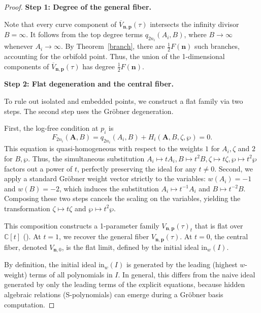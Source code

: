 \documentclass[11pt]{amsart}
\theoremstyle{remark}
\numberwithin{equation}{section}
\begin{document}
\begin{proof}
\textbf{Step 1: Degree of the general fiber.}

Note that every curve component of $\overline{V}_{\mathbf{n},\mathbf{p}}(\tau)$ intersects the infinity divisor $B =\infty$. It follows from the top degree terms $q_{2n_i}(A_i,B)$, where $B \rightarrow \infty$ whenever $A_i \rightarrow \infty$. By Theorem~\ref{branch}, there are $\frac{1}{2} F(\mathbf{n})$ such branches, accounting for the orbifold point. Thus, the union of the 1-dimensional components of $\overline{V}_{\mathbf{n},\mathbf{p}}(\tau)$ has degree $\frac{1}{2} F(\mathbf{n})$.

\vspace{0.5em}
\noindent \textbf{Step 2: Flat degeneration and the central fiber.} 

To rule out isolated and embedded points, we construct a flat family via two steps. The second step uses the Gr\"obner degeneration. 

First, the log-free condition at $p_i$ is 
\[
    F_{2n_i}(\mathbf{A}, B) = q_{2n_i}(A_i, B) + H_i (\mathbf{A},B,\zeta,\wp) = 0.
\]
This equation is quasi-homogeneous with respect to the weights $1$ for $A_i, \zeta$ and $2$ for $B, \wp$. Thus, the simultaneous substitution $A_i \mapsto tA_i, B \mapsto t^2B, \zeta \mapsto t\zeta, \wp \mapsto t^2\wp$ factors out a power of $t$, perfectly preserving the ideal for any $t \neq 0$. 
Second, we apply a standard Gr\"obner weight vector strictly to the variables: $w(A_i) = -1$ and $w(B) = -2$, which induces the substitution $A_i \mapsto t^{-1}A_i$ and $B \mapsto t^{-2}B$. Composing these two steps cancels the scaling on the variables, yielding the transformation $\zeta \mapsto t\zeta$ and $\wp \mapsto t^2\wp$. 

This composition constructs a 1-parameter family $V_{\mathbf{n},\mathbf{p}}(\tau)_t$ that is flat over $\mathbb{C}[t]$ (\cite[Theorem 15.17]{Eisenbud_commutative_algebra_1995}). At $t=1$, we recover the general fiber $V_{\mathbf{n},\mathbf{p}}(\tau)$. At $t=0$, the central fiber, denoted $V_{\mathbf{n},0}$, is the flat limit, defined by the initial ideal $\text{in}_w(I)$.

By definition, the initial ideal $\text{in}_w(I)$ is generated by the leading (highest $w$-weight) terms of all polynomials in $I$. In general, this differs from the naive ideal generated by only the leading terms of the explicit equations, because hidden algebraic relations (S-polynomials) can emerge during a Gr\"obner basis computation. 


\end{proof}
\end{document}
